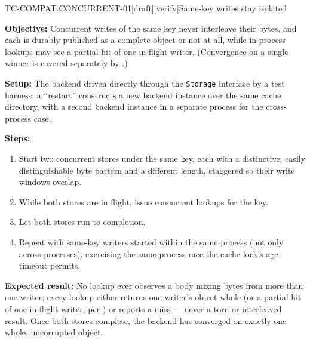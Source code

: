 \begin{requirement}{TC-COMPAT.CONCURRENT-01}[draft][verify]{Same-key writes stay isolated}


  \textbf{Objective:} Concurrent writes of the same key never interleave
  their bytes, and each is durably published as a complete object or not
  at all, while in-process lookups may see a partial hit of one in-flight
  writer. (Convergence on a single winner is covered separately by
  .)

  \textbf{Setup:} The backend driven directly through the \texttt{Storage}
  interface by a test harness; a ``restart'' constructs a new backend instance
  over the same cache directory, with a second backend instance in a separate
  process for the cross-process case.

  \textbf{Steps:}
  \begin{enumerate}
    \item Start two concurrent stores under the same key, each with a
      distinctive, easily distinguishable byte pattern and a different
      length, staggered so their write windows overlap.
    \item While both stores are in flight, issue concurrent lookups for the
      key.
    \item Let both stores run to completion.
    \item Repeat with same-key writers started within the same process (not
      only across processes), exercising the same-process race the cache
      lock's age timeout permits.
  \end{enumerate}

  \textbf{Expected result:} No lookup ever observes a body mixing bytes from
  more than one writer; every lookup either returns one writer's object whole
  (or a partial hit of one in-flight writer, per
  ) or reports a miss --- never a torn
  or interleaved result. Once both stores complete, the backend has converged
  on exactly one whole, uncorrupted object.



\end{requirement}

